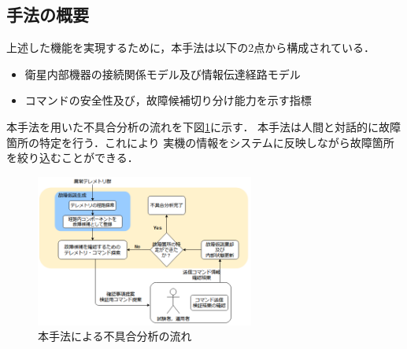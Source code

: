 \documentclass[11pt]{jsarticle}%
\begin{document}
\begin{multicols}{2}
\subsection{手法の概要}
\vspace{-1zh}
上述した機能を実現するために，本手法は以下の2点から構成されている．
\begin{itemize} %
  \item 衛星内部機器の接続関係モデル及び情報伝達経路モデル
  \item コマンドの安全性及び，故障候補切り分け能力を示す指標
\end{itemize}
本手法を用いた不具合分析の流れを下図\ref{fig:fault_diagnosis_algorithm}に示す．
本手法は人間と対話的に故障箇所の特定を行う．これにより %
実機の情報をシステムに反映しながら故障箇所を絞り込むことができる．

\begin{figure}[H]
  \centering
    \includegraphics[height=5.0cm]{../figure/fault_diagnosis_algorithm.png}
    \caption{本手法による不具合分析の流れ}
    \label{fig:fault_diagnosis_algorithm}
\end{figure}


\end{multicols}
\end{document}
